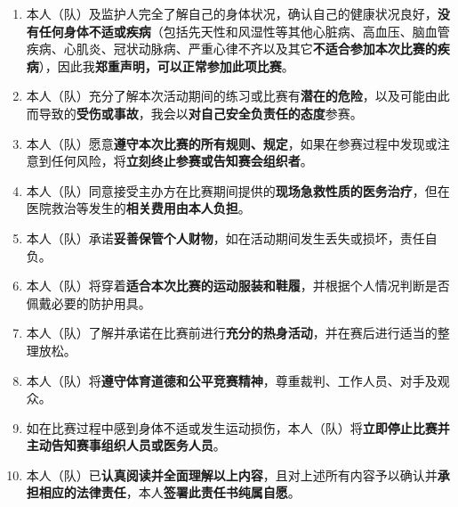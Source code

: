 \documentclass{article}
\begin{document}
\begin{enumerate} %
\item 本人（队）及监护人完全了解自己的身体状况，确认自己的健康状况良好，\textbf{没有任何身体不适或疾病}（包括先天性和风湿性等其他心脏病、高血压、脑血管疾病、心肌炎、冠状动脉病、严重心律不齐以及其它\textbf{不适合参加本次比赛的疾病}），因此我\textbf{郑重声明，可以正常参加此项比赛}。
\item 本人（队）充分了解本次活动期间的练习或比赛有\textbf{潜在的危险}，以及可能由此而导致的\textbf{受伤或事故}，我会以\textbf{对自己安全负责任的态度}参赛。
\item 本人（队）愿意\textbf{遵守本次比赛的所有规则、规定}，如果在参赛过程中发现或注意到任何风险，将\textbf{立刻终止参赛或告知赛会组织者}。
\item 本人（队）同意接受主办方在比赛期间提供的\textbf{现场急救性质的医务治疗}，但在医院救治等发生的\textbf{相关费用由本人负担}。
\item 本人（队）承诺\textbf{妥善保管个人财物}，如在活动期间发生丢失或损坏，责任自负。
\item 本人（队）将穿着\textbf{适合本次比赛的运动服装和鞋履}，并根据个人情况判断是否佩戴必要的防护用具。
\item 本人（队）了解并承诺在比赛前进行\textbf{充分的热身活动}，并在赛后进行适当的整理放松。
\item 本人（队）将\textbf{遵守体育道德和公平竞赛精神}，尊重裁判、工作人员、对手及观众。
\item 如在比赛过程中感到身体不适或发生运动损伤，本人（队）将\textbf{立即停止比赛并主动告知赛事组织人员或医务人员}。
\item 本人（队）已\textbf{认真阅读并全面理解以上内容}，且对上述所有内容予以确认并\textbf{承担相应的法律责任}，本人\textbf{签署此责任书纯属自愿}。
\end{enumerate}

\vspace{0.5cm} %
\end{document}
